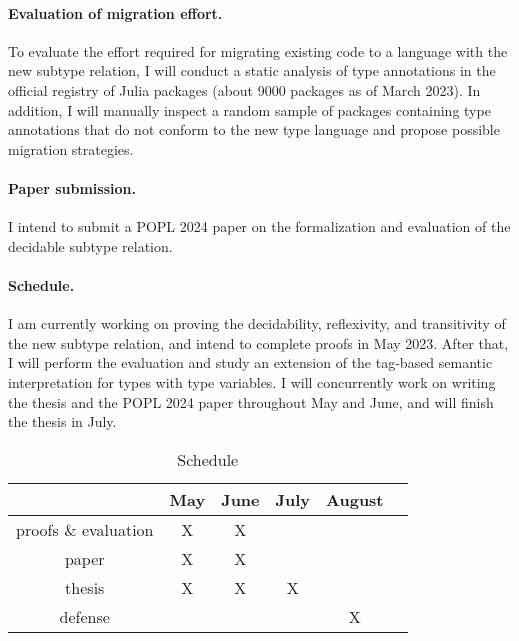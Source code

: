 \paragraph*{Evaluation of migration effort.}
To evaluate the effort required for migrating existing code to a language
with the new subtype relation, I will conduct a static analysis of type
annotations in the official registry of Julia packages
(about 9000 packages as of March 2023).
In addition, I will manually inspect a random sample of packages containing
type annotations that do not conform to the new type language
and propose possible migration strategies.

\paragraph*{Paper submission.}
I intend to submit a POPL 2024 paper on the formalization and evaluation of
the decidable subtype relation.

\paragraph*{Schedule.}
I am currently working on proving the decidability, reflexivity,
and transitivity of the new subtype relation,
and intend to complete proofs in May 2023.
After that, I will perform the evaluation
and study an extension of the tag-based semantic interpretation
for types with type variables.
I will concurrently work on writing the thesis and the POPL 2024 paper
throughout May and June, and will finish the thesis in July.

\begin{table}[h]
  \caption{Schedule}
  \vspace*{0.25em}
  \centering\footnotesize
  \begin{tabular}{c|ccccc}
  \toprule
  & May & June & July & August \\
  \midrule
  proofs \& evaluation & X & X & & \\
  paper & X & X & & \\
  thesis & X & X & X & \\
  defense & & & & X \\
\end{tabular}
\end{table}






